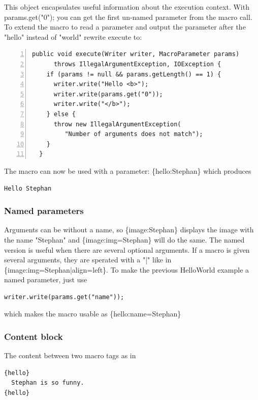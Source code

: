 \documentclass[a4paper,pdftex]{article}
\begin{document}
This object encapsulates useful information about the execution context. 
With params.get("0"); you can get the first un-named parameter from the macro call. To extend the macro 
to read a parameter and output the parameter after the "hello" instead of "world" rewrite execute to:

\begin{Verbatim}[gobble=2,frame=single,numbers=left,fontsize=\small]
  public void execute(Writer writer, MacroParameter params)
      throws IllegalArgumentException, IOException {
    if (params != null && params.getLength() == 1) {
      writer.write("Hello <b>");
      writer.write(params.get("0"));
      writer.write("</b>");
    } else {
      throw new IllegalArgumentException(
         "Number of arguments does not match");
    }
  }
\end{Verbatim}

The macro can now be used with a parameter: \{hello:Stephan\} which produces

\begin{verbatim}
Hello Stephan
\end{verbatim}

\subsubsection{Named parameters}

Arguments can be without a name, so \{image:Stephan\} displays the image with the
name "Stephan" and \{image:img=Stephan\} will do the same. 
The named version is useful when there are several optional arguments. 
If a macro is given several arguments, they are sperated with a 
"|" like in \{image:img=Stephan|align=left\}. To make the previous HelloWorld example a named
parameter, just use

\begin{verbatim}
writer.write(params.get("name"));
\end{verbatim}

which makes the macro usable as \{hello:name=Stephan\}

\subsubsection{Content block}

The content between two macro tags as in

\begin{verbatim}
{hello}
  Stephan is so funny.
{hello}
\end{verbatim}
\end{document}
